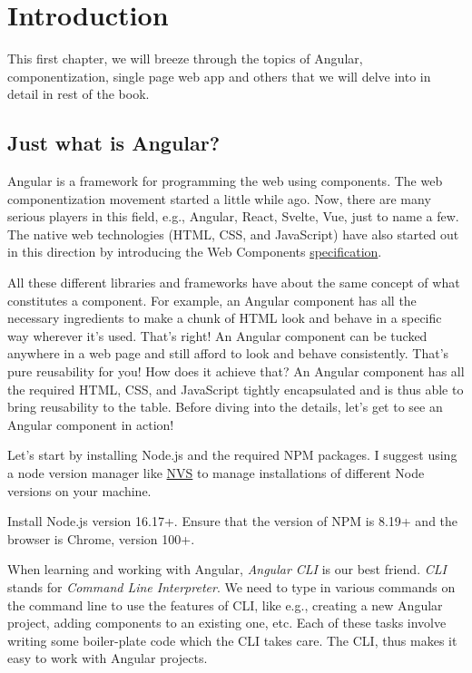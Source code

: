 \documentclass{report}
\begin{document}
	\chapter{Introduction}
	This first chapter, we will breeze through the topics of Angular, componentization, single page web app and others that we will delve into in detail in rest of the book.
	
	\section{Just what is Angular?}
Angular is a framework for programming the web using components. The web componentization movement started a little while ago. Now, there are many serious players in this field, e.g., Angular, React, Svelte, Vue, just to name a few. The native web technologies (HTML, CSS, and JavaScript) have also started out in this direction by introducing the Web Components \href{https://www.webcomponents.org/specs}{specification}.

All these different libraries and frameworks have about the same concept of what constitutes a component. For example, an Angular component has all the necessary ingredients to make a chunk of HTML look and behave in a specific way wherever it's used. That's right! An Angular component can be tucked anywhere in a web page and still afford to look and behave consistently. That's pure reusability for you! How does it achieve that? An Angular component has all the required HTML, CSS, and JavaScript tightly encapsulated and is thus able to bring reusability to the table. Before diving into the details, let's get to see an Angular component in action!

Let's start by installing Node.js and the required NPM packages. I suggest using a node version manager like \href{https://github.com/jasongin/nvs}{NVS} to manage installations of different Node versions on your machine.

Install Node.js version 16.17+. Ensure that the version of NPM is 8.19+ and the browser is Chrome, version 100+.

When learning and working with Angular, \textsl{Angular CLI} is our best friend. \textsl{CLI} stands for \textsl{Command Line Interpreter}. We need to type in various commands on the command line to use the features of CLI, like e.g., creating a new Angular project, adding components to an existing one, etc. Each of these tasks involve writing some boiler-plate code which the CLI takes care. The CLI, thus makes it easy to work with Angular projects.
\end{document}
